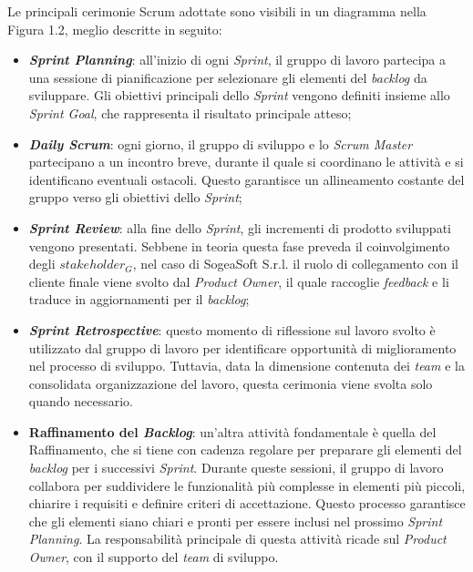     \noindent Le principali cerimonie Scrum adottate sono visibili in un diagramma nella Figura 1.2, meglio descritte in seguito:
    \begin{itemize}
    
        \item \textbf{\textit{Sprint Planning}}: all'inizio di ogni \textit{Sprint}, il gruppo di lavoro partecipa a una sessione di pianificazione per selezionare gli elementi del \textit{backlog} da sviluppare. Gli obiettivi principali dello \textit{Sprint} vengono definiti insieme allo \textit{Sprint Goal}, che rappresenta il risultato principale atteso;

        \item \textbf{\textit{Daily Scrum}}: ogni giorno, il gruppo di sviluppo e lo \textit{Scrum Master} partecipano a un incontro breve, durante il quale si coordinano le attività e si identificano eventuali ostacoli. Questo garantisce un allineamento costante del gruppo verso gli obiettivi dello \textit{Sprint};

        \item \textbf{\textit{Sprint Review}}: alla fine dello \textit{Sprint}, gli incrementi di prodotto sviluppati vengono presentati. Sebbene in teoria questa fase preveda il coinvolgimento degli \textit{$stakeholder_G$}, nel caso di SogeaSoft S.r.l. il ruolo di collegamento con il cliente finale viene svolto dal \textit{Product Owner}, il quale raccoglie \textit{feedback} e li traduce in aggiornamenti per il \textit{backlog};  

        \item \textbf{\textit{Sprint Retrospective}}: questo momento di riflessione sul lavoro svolto è utilizzato dal gruppo di lavoro per identificare opportunità di miglioramento nel processo di sviluppo. Tuttavia, data la dimensione contenuta dei \textit{team} e la consolidata organizzazione del lavoro, questa cerimonia viene svolta solo quando necessario.  

        \item \textbf{Raffinamento del \textit{Backlog}}: un'altra attività fondamentale è quella del Raffinamento, che si tiene con cadenza regolare per preparare gli elementi del \textit{backlog} per i successivi \textit{Sprint}. Durante queste sessioni, il gruppo di lavoro collabora per suddividere le funzionalità più complesse in elementi più piccoli, chiarire i requisiti e definire criteri di accettazione. Questo processo garantisce che gli elementi siano chiari e pronti per essere inclusi nel prossimo \textit{Sprint Planning}. La responsabilità principale di questa attività ricade sul \textit{Product Owner}, con il supporto del \textit{team} di sviluppo.
        
    \end{itemize}
    
